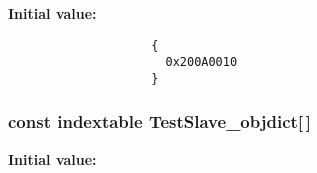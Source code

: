 \textbf{Initial value:}

\begin{Code}\begin{verbatim} 
                    {
                      0x200A0010        
                    }
\end{verbatim}\end{Code}
\subsubsection{\setlength{\rightskip}{0pt plus 5cm}const {\bf indextable} {\bf Test\-Slave\_\-objdict}[$\,$]}\label{TestSlave_8c_5db1bf19a21c6c117b3847850e9a0e6c}


\textbf{Initial value:}

